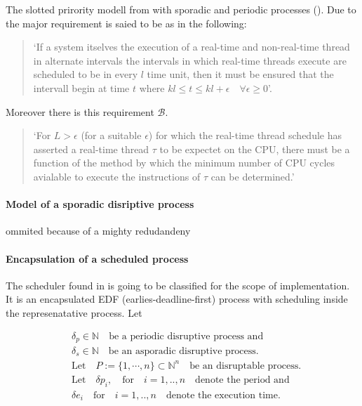 The slotted prirority modell from \cite{B} with  sporadic and periodic processes (\cite{K}).
Due to \cite{B97} the major requirement is saied to be as in the following:

\begin{quote}
	`If a system itselves the execution of a real-time and non-real-time thread in alternate intervals the intervals in which real-time threads execute are scheduled to be in every $l$ time unit, then it must be ensured that the intervall begin at time $t$ where $kl \leq t \leq kl+\epsilon \quad \forall
 \epsilon \geq 0$'.
\end{quote}

Moreover there is this requirement $\mathcal{B}$.
\begin{quote}
`For $L>\epsilon$ (for a suitable $\epsilon$) for which the real-time thread schedule has asserted a real-time thread $\tau$ to be expectet on the CPU, there must be a function of the method by which the minimum number of CPU cycles avialable to execute the instructions of $\tau$ can be determined.'
\end{quote}

\paragraph{Model of a sporadic disriptive process}
ommited because of a mighty redudandeny

\paragraph*{Encapsulation of a scheduled process}
 
The scheduler found  in \cite{K} is going to be classified for the scope of implementation. It is an encapsulated EDF (earlies-deadline-first) process with scheduling inside the represenatative process.
Let
      
\begin{align}
 & \delta_p \in \mathbb{N} \quad \text{be a periodic disruptive process and}\\
 	&\delta_s \in  \mathbb{N} \quad \text{be an asporadic disruptive process.}\\
	 &\text{Let} \quad P := \{1, \cdots, n \} \subset \mathbb{N}^n \quad \text{be an disruptable process.}  \\
 	&\text{Let} \quad  \delta p_i, \quad \text{for} \quad i = 1,..,n \quad  \text{denote the period and}  \\
 	&\delta e_i \quad \text{for} \quad  i = 1,..,n \quad  \text{denote the execution time}.  
\end{align}   

